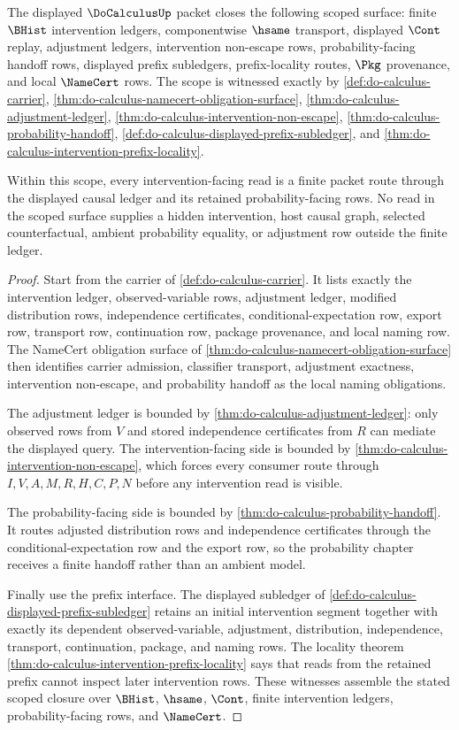 \begin{theorem}
\label{thm:do-calculus-scoped-closure-route}
The displayed $\DoCalculusUp$ packet closes the following scoped surface: finite $\BHist$ intervention ledgers, componentwise $\hsame$ transport, displayed $\Cont$ replay, adjustment ledgers, intervention non-escape rows, probability-facing handoff rows, displayed prefix subledgers, prefix-locality routes, $\Pkg$ provenance, and local $\NameCert$ rows. The scope is witnessed exactly by \autoref{def:do-calculus-carrier}, \autoref{thm:do-calculus-namecert-obligation-surface}, \autoref{thm:do-calculus-adjustment-ledger}, \autoref{thm:do-calculus-intervention-non-escape}, \autoref{thm:do-calculus-probability-handoff}, \autoref{def:do-calculus-displayed-prefix-subledger}, and \autoref{thm:do-calculus-intervention-prefix-locality}.

Within this scope, every intervention-facing read is a finite packet route through the displayed causal ledger and its retained probability-facing rows. No read in the scoped surface supplies a hidden intervention, host causal graph, selected counterfactual, ambient probability equality, or adjustment row outside the finite ledger.
\end{theorem}
\begin{proof}
Start from the carrier of \autoref{def:do-calculus-carrier}. It lists exactly the intervention ledger, observed-variable rows, adjustment ledger, modified distribution rows, independence certificates, conditional-expectation row, export row, transport row, continuation row, package provenance, and local naming row. The NameCert obligation surface of \autoref{thm:do-calculus-namecert-obligation-surface} then identifies carrier admission, classifier transport, adjustment exactness, intervention non-escape, and probability handoff as the local naming obligations.

The adjustment ledger is bounded by \autoref{thm:do-calculus-adjustment-ledger}: only observed rows from $V$ and stored independence certificates from $R$ can mediate the displayed query. The intervention-facing side is bounded by \autoref{thm:do-calculus-intervention-non-escape}, which forces every consumer route through $I,V,A,M,R,H,C,P,N$ before any intervention read is visible.

The probability-facing side is bounded by \autoref{thm:do-calculus-probability-handoff}. It routes adjusted distribution rows and independence certificates through the conditional-expectation row and the export row, so the probability chapter receives a finite handoff rather than an ambient model.

Finally use the prefix interface. The displayed subledger of \autoref{def:do-calculus-displayed-prefix-subledger} retains an initial intervention segment together with exactly its dependent observed-variable, adjustment, distribution, independence, transport, continuation, package, and naming rows. The locality theorem \autoref{thm:do-calculus-intervention-prefix-locality} says that reads from the retained prefix cannot inspect later intervention rows. These witnesses assemble the stated scoped closure over $\BHist$, $\hsame$, $\Cont$, finite intervention ledgers, probability-facing rows, and $\NameCert$.
\end{proof}
